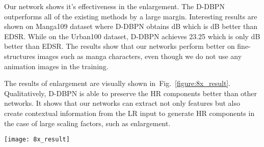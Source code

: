 \documentclass[10pt,twocolumn,letterpaper]{article}
\begin{document}
Our network shows it's effectiveness in the  enlargement. The D-DBPN outperforms all of the existing methods by a large margin. Interesting results are shown on Manga109 dataset where D-DBPN obtains  dB which is  dB better than EDSR. While on the Urban100 dataset, D-DBPN achieves 23.25 which is only  dB better than EDSR. The results show that our networks perform better on fine-structures images such as manga characters, even though we do not use any animation images in the training.

The results of  enlargement are visually shown in~Fig.~\ref{figure:8x_result}. Qualitatively, D-DBPN is able to preserve the HR components better than other networks. It shows that our networks can extract not only features but also create contextual information from the LR input to generate HR components in the case of large scaling factors, such as  enlargement.



\begin{figure*}
\centering
\texttt{[image: 8x\_result]}
\caption{Qualitative comparison of our models with other works on  super-resolution.  line: LapSRN~\cite{LapSRN} (19.77 dB), EDSR~\cite{Lim_2017_CVPR_Workshops} (19.79 dB), and Ours (19.82 dB).  line: LapSRN~\cite{LapSRN} (16.45 dB), EDSR~\cite{Lim_2017_CVPR_Workshops} (19.1 dB), and Ours (23.1 dB).  line: LapSRN~\cite{LapSRN} (24.34 dB), EDSR~\cite{Lim_2017_CVPR_Workshops} (25.29 dB), and Ours (28.84 dB)}
\label{figure:8x_result}
\end{figure*}
\end{document}
